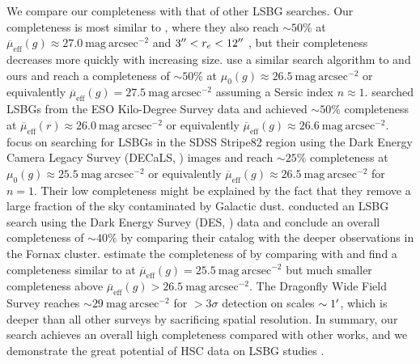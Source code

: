 \documentclass[twocolumn,astrosymb,twocolappendix]{aastex631}
\newcommand{\sbunit}{\mathrm{mag\ arcsec}^{-2}}
\newcommand{\sbeff}{\overline{\mu}_{\mathrm{eff}}(g)}
\newcommand{\sbeffr}{\overline{\mu}_{\mathrm{eff}}(r)}
\begin{document}
\begin{CJK*}{UTF8}{gbsn}
We compare our completeness with that of other LSBG searches. Our completeness is most similar to , where they also reach $\sim 50\%$ at $\sbeff \approx 27.0\ \sbunit$ and $3\mbox{$^{\prime\prime}$} < r_e < 12\mbox{$^{\prime\prime}$}$ \citep{Kado-Fong2021,Greene2022}, but their completeness decreases more quickly with increasing size. \citet{CarlstenELVES2022} use a similar search algorithm to  and ours and reach a completeness of $\sim 50\%$ at $\mu_0(g)\approx 26.5\ \sbunit$ or equivalently $\sbeff = 27.5\ \sbunit$ assuming a Sersic index $n \approx 1$. \citet{vdBurg2017} searched LSBGs from the ESO Kilo-Degree Survey data and achieved $\sim 50\%$ completeness at $\sbeffr\approx 26.0\ \sbunit$ or equivalently $\sbeff \approx 26.6\ \sbunit$. \citet{Zaritsky2021} focus on searching for LSBGs in the SDSS Stripe82 region using the Dark Energy Camera Legacy Survey (DECaLS, \citealt{Dey2019}) images and reach $\sim 25\%$ completeness at $\mu_{0}(g) \approx 25.5\ \sbunit$ or equivalently $\sbeff \approx 26.5\ \sbunit$ for $n=1$. Their low completeness might be explained by the fact that they remove a large fraction of the sky contaminated by Galactic dust. \citet{Tanoglidis2021} conducted an LSBG search using the Dark Energy Survey (DES, \citealt{Abbot2018}) data and conclude an overall completeness of $\sim 40\%$ by comparing their catalog with the deeper observations in the Fornax cluster. \citet{Kado-Fong2021} estimate the completeness of \citet{Tanoglidis2021} by comparing with  and find a completeness similar to  at $\sbeff = 25.5\ \sbunit$ but much smaller completeness above $\sbeff > 26.5\ \sbunit$. The Dragonfly Wide Field Survey \citep{Danieli2020} reaches $\sim 29\ \sbunit$ for $>3\sigma$ detection on scales $\sim 1\mbox{$^\prime$}$, which is deeper than all other surveys by sacrificing spatial resolution. In summary, our search achieves an overall high completeness compared with other works, and we demonstrate the great potential of HSC data on LSBG studies \citep[e.g.,][]{Huang2018,Kado-Fong2018}. 


\end{CJK*}
\end{document}
